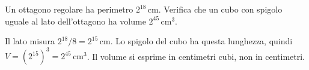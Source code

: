 
\begin{esercizio}
Un ottagono regolare ha perimetro $2^{18}\,\mathrm{cm}$. Verifica che un cubo con spigolo uguale al lato dell'ottagono ha volume $2^{45}\,\mathrm{cm}^3$.
\end{esercizio}

\begin{soluzione}
Il lato misura $2^{18}/8=2^{15}\,\mathrm{cm}$. Lo spigolo del cubo ha questa lunghezza, quindi $V=(2^{15})^3=2^{45}\,\mathrm{cm}^3$. Il volume si esprime in centimetri cubi, non in centimetri.
\end{soluzione}
